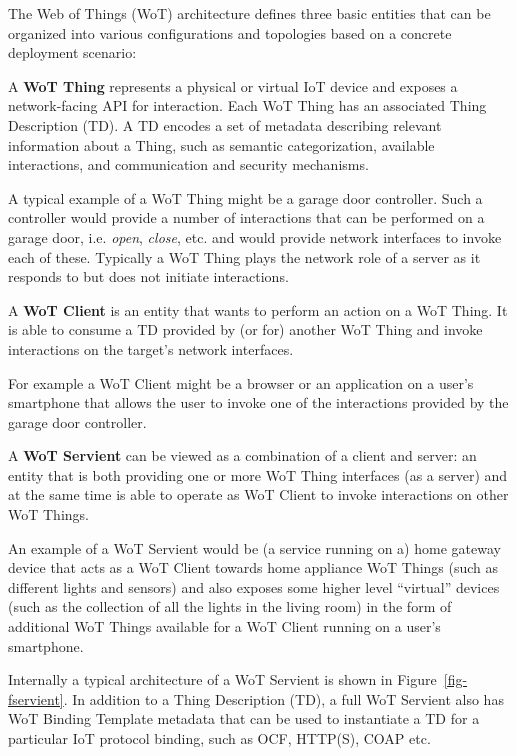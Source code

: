 The Web of Things (WoT) architecture\cite{Wot2017arch} defines three basic entities
that can be organized into various configurations and topologies 
based on a concrete deployment scenario:

A \textbf{WoT Thing} represents a physical or virtual IoT device 
        and exposes a network-facing API for interaction.
	Each WoT Thing has an associated Thing Description (TD)\cite{Wot2017td}. 
        A TD encodes a set of metadata describing relevant information about a Thing,
        such as semantic categorization, available interactions, and communication and security mechanisms.

A typical example of a WoT Thing might be a garage door controller.
Such a controller would provide a number of interactions that can be performed on a garage door, 
i.e. \textit{open}, \textit{close}, etc. and would provide network interfaces to invoke
each of these.
Typically a WoT Thing plays the network role of a server as it responds to
but does not initiate interactions.


A \textbf{WoT Client} is an entity that wants to perform an action on a WoT Thing.
It is able to consume a TD provided by (or for) another WoT Thing and invoke interactions on 
the target's network interfaces.

For example a WoT Client might be a browser or an application on a user's smartphone
that allows the user to invoke one of the interactions provided by the garage door controller. 


A \textbf{WoT Servient} can be viewed as a combination of a client and server:
        an entity that is both providing one or more WoT Thing interfaces (as a server) and
        at the same time is able to operate as WoT Client to invoke interactions on other WoT Things.

An example of a WoT Servient would be (a service running on a) home gateway device 
that acts as a WoT Client towards home appliance WoT Things
(such as different lights and sensors) and also exposes some higher level
``virtual'' devices (such as the collection of all the lights in the living room)
in the form of additional WoT Things available for a WoT Client running on a user's smartphone.


Internally a typical architecture of a WoT Servient is shown in Figure~\ref{fig-fservient}. 
In addition to a Thing Description (TD), a full WoT Servient also has WoT Binding Template 
metadata that can be used to instantiate a TD for a particular IoT protocol binding, 
such as OCF, HTTP(S), COAP etc. 

